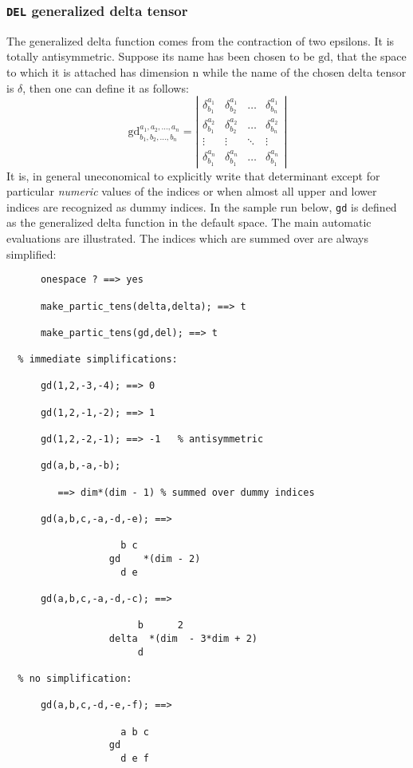 \subsubsection{\texttt{DEL} generalized delta tensor}
The generalized delta function comes from the contraction of two epsilons.
It is totally antisymmetric. Suppose its name has been chosen to be $\mathrm{gd}$,
that the space to which it is
attached has dimension n  while the name of the chosen delta tensor
is $\delta$, then
one can define it as follows:
\[
\mathrm{gd}^{a_1,a_2,\ldots,a_n}_{b_1,b_2,\ldots, b_n}=
\left|\begin{array}{cccc}
	\delta^{a_1}_{b_1}  & \delta^{a_1}_{b_2} & \ldots & \delta^{a_1}_{b_n}  \\
	\delta^{a_2}_{b_1} & \delta^{a_2}_{b_2} & \ldots & \delta^{a_2}_{b_n} \\
        \vdots & \vdots & \ddots & \vdots \\
        \delta^{a_n}_{b_1} & \delta^{a_n}_{b_1} & \ldots & \delta^{a_n}_{b_1}
 \end{array}
\right|
\]
It is, in general uneconomical to explicitly write that determinant except
for particular \emph{numeric}  values of the indices
%
%
 or when almost all
upper and lower indices are recognized as dummy indices.
In the sample run below, \texttt{gd} is defined as the generalized delta function
in the default space. The main automatic evaluations are illustrated.
The indices which are summed over are always simplified:
\begin{verbatim}
      onespace ? ==> yes

      make_partic_tens(delta,delta); ==> t

      make_partic_tens(gd,del); ==> t

  % immediate simplifications:

      gd(1,2,-3,-4); ==> 0

      gd(1,2,-1,-2); ==> 1

      gd(1,2,-2,-1); ==> -1   % antisymmetric

      gd(a,b,-a,-b);

         ==> dim*(dim - 1) % summed over dummy indices

      gd(a,b,c,-a,-d,-e); ==>

                    b c
                  gd    *(dim - 2)
                    d e

      gd(a,b,c,-a,-d,-c); ==>

                       b      2
                  delta  *(dim  - 3*dim + 2)
                       d

  % no simplification:

      gd(a,b,c,-d,-e,-f); ==>

                    a b c
                  gd
                    d e f
\end{verbatim}
